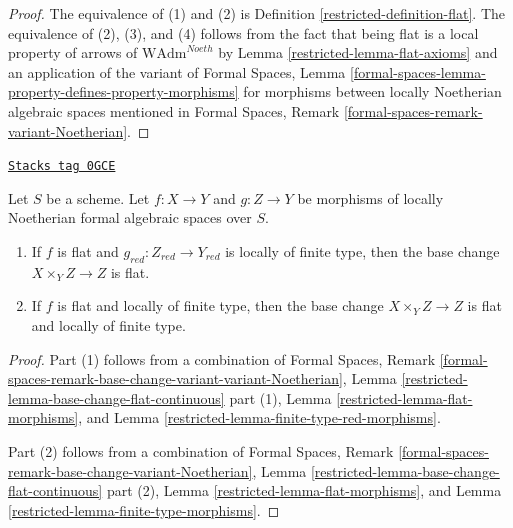 \begin{proof}

The equivalence of (1) and (2) is Definition \ref{restricted-definition-flat}.
The equivalence of (2), (3), and (4) follows from the fact that
being flat is a local property of arrows of
$\text{WAdm}^{Noeth}$ by Lemma \ref{restricted-lemma-flat-axioms}
and an application of the variant of
Formal Spaces, Lemma
\ref{formal-spaces-lemma-property-defines-property-morphisms}
for morphisms between locally Noetherian algebraic spaces
mentioned in
Formal Spaces, Remark
\ref{formal-spaces-remark-variant-Noetherian}.
\end{proof}

\begin{lemma}
\label{restricted-lemma-base-change-flat}
\href{https://stacks.math.columbia.edu/tag/0GCE}{\texttt{Stacks tag 0GCE}}

Let $S$ be a scheme. Let $f : X \to Y$ and $g : Z \to Y$
be morphisms of locally Noetherian formal algebraic spaces over $S$.
\begin{enumerate}
\item If $f$ is flat and $g_{red} : Z_{red} \to Y_{red}$ is
locally of finite type, then the base change
$X \times_Y Z \to Z$ is flat.
\item If $f$ is flat and locally of finite type, then
the base change $X \times_Y Z \to Z$ is flat and locally of finite type.
\end{enumerate}
\end{lemma}

\begin{proof}

Part (1) follows from a combination of
Formal Spaces, Remark
\ref{formal-spaces-remark-base-change-variant-variant-Noetherian},
Lemma \ref{restricted-lemma-base-change-flat-continuous} part (1),
Lemma \ref{restricted-lemma-flat-morphisms}, and
Lemma \ref{restricted-lemma-finite-type-red-morphisms}.

\medskip\noindent
Part (2) follows from a combination of
Formal Spaces, Remark
\ref{formal-spaces-remark-base-change-variant-Noetherian},
Lemma \ref{restricted-lemma-base-change-flat-continuous} part (2),
Lemma \ref{restricted-lemma-flat-morphisms}, and
Lemma \ref{restricted-lemma-finite-type-morphisms}.
\end{proof}

